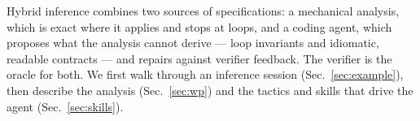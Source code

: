 \label{sec:hybrid}

Hybrid inference combines two sources of specifications: a mechanical \WP analysis, which is exact where it applies and stops at loops, and a coding agent, which proposes what the analysis cannot derive --- loop invariants and idiomatic, readable contracts --- and repairs against verifier feedback.
The verifier is the oracle for both.
We first walk through an inference session (Sec.~\ref{sec:example}), then describe the \WP analysis (Sec.~\ref{sec:wp}) and the tactics and skills that drive the agent (Sec.~\ref{sec:skills}).





